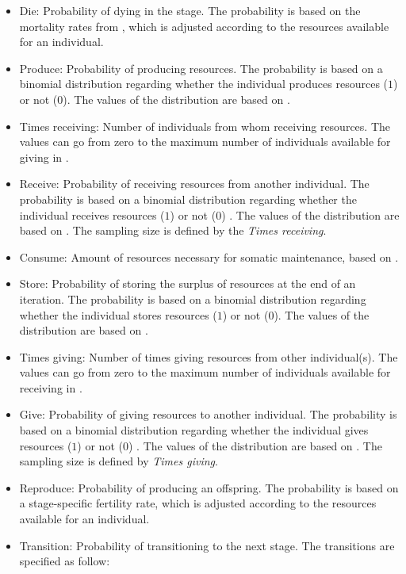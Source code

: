 \documentclass{article}
\begin{document}
\begin{itemize}
    \item Die: Probability of dying in the stage. The probability is based on the mortality rates from \cite{gurven2007longevity}, which is adjusted according to the resources available for an individual.
    \item Produce: Probability of producing resources. The probability is based on a binomial distribution regarding whether the individual produces resources ($1$) or not ($0$). The values of the distribution are based on \cite{koster2020life}.
    \item Times receiving: Number of individuals from whom receiving resources. The values can go from zero to the maximum number of individuals available for giving in \cite{gurven2004give}.
    \item Receive: Probability of receiving resources from another individual. The probability is based on a binomial distribution regarding whether the individual receives resources ($1$) or not ($0$) . The values of the distribution are based on \cite{gurven2004give}. The sampling size is defined by the \emph{Times receiving}.
    \item Consume: Amount of resources necessary for somatic maintenance, based on \cite{kaplan2000theory}.
    \item Store: Probability of storing the surplus of resources at the end of an iteration. The probability is based on a binomial distribution regarding whether the individual stores resources ($1$) or not ($0$). The values of the distribution are based on \citep{bowles2011cultivation}.
    \item Times giving: Number of times giving resources from other individual(s). The values can go from zero to the maximum number of individuals available for receiving in \cite{gurven2004give}.
    \item Give: Probability of giving resources to another individual. The probability is based on a binomial distribution regarding whether the individual gives resources ($1$) or not ($0$) . The values of the distribution are based on \cite{gurven2004give}. The sampling size is defined by \emph{Times giving}.
    \item Reproduce: Probability of producing an offspring. The probability is based on a stage-specific fertility rate, which is adjusted according to the resources available for an individual.
    \item Transition: Probability of transitioning to the next stage. The transitions are specified as follow:

\end{itemize}
\end{document}
